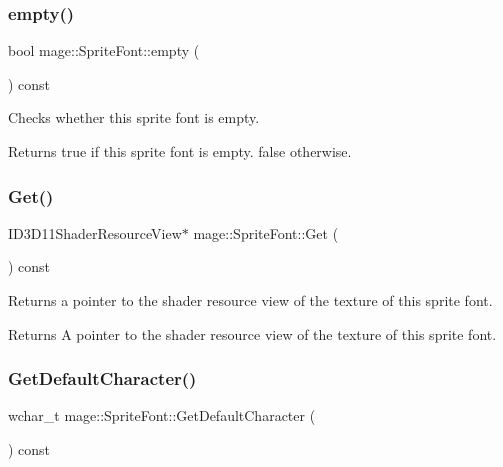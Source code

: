 \subsubsection{\texorpdfstring{empty()}{empty()}}
{\footnotesize\ttfamily bool mage\+::\+Sprite\+Font\+::empty (\begin{DoxyParamCaption}{ }\end{DoxyParamCaption}) const\hspace{0.3cm}{\ttfamily [noexcept]}}

Checks whether this sprite font is empty.

\begin{DoxyReturn}{Returns}
{\ttfamily true} if this sprite font is empty. {\ttfamily false} otherwise. 
\end{DoxyReturn}
\hypertarget{classmage_1_1_sprite_font_a8e43f8d97fb7e5ee03ed49fb45ee1b5f}{}\label{classmage_1_1_sprite_font_a8e43f8d97fb7e5ee03ed49fb45ee1b5f} 
\subsubsection{\texorpdfstring{Get()}{Get()}}
{\footnotesize\ttfamily I\+D3\+D11\+Shader\+Resource\+View$\ast$ mage\+::\+Sprite\+Font\+::\+Get (\begin{DoxyParamCaption}{ }\end{DoxyParamCaption}) const\hspace{0.3cm}{\ttfamily [noexcept]}}

Returns a pointer to the shader resource view of the texture of this sprite font.

\begin{DoxyReturn}{Returns}
A pointer to the shader resource view of the texture of this sprite font. 
\end{DoxyReturn}
\hypertarget{classmage_1_1_sprite_font_a9be513809e714558708cab21a22d7316}{}\label{classmage_1_1_sprite_font_a9be513809e714558708cab21a22d7316} 
\subsubsection{\texorpdfstring{Get\+Default\+Character()}{GetDefaultCharacter()}}
{\footnotesize\ttfamily wchar\+\_\+t mage\+::\+Sprite\+Font\+::\+Get\+Default\+Character (\begin{DoxyParamCaption}{ }\end{DoxyParamCaption}) const\hspace{0.3cm}{\ttfamily [noexcept]}}

